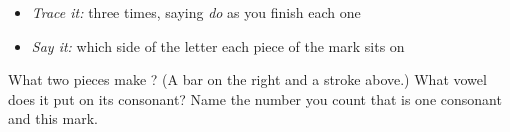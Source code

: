 \begin{quote}
\end{quote}

\begin{itemize}
\raggedright
  \item \emph{Trace it:}  three times, saying \emph{do} as you finish each one
  \item \emph{Say it:} which side of the letter each piece of the mark sits on
\end{itemize}

\begin{tcolorbox}[breakable,colback=teal!4,colframe=teal!35!black,title={Before you move on}]
What two pieces make \textbf{}? (A bar on the right and a stroke above.) What vowel does it put on its consonant? Name the number you count that is one consonant and this mark.
\end{tcolorbox}
